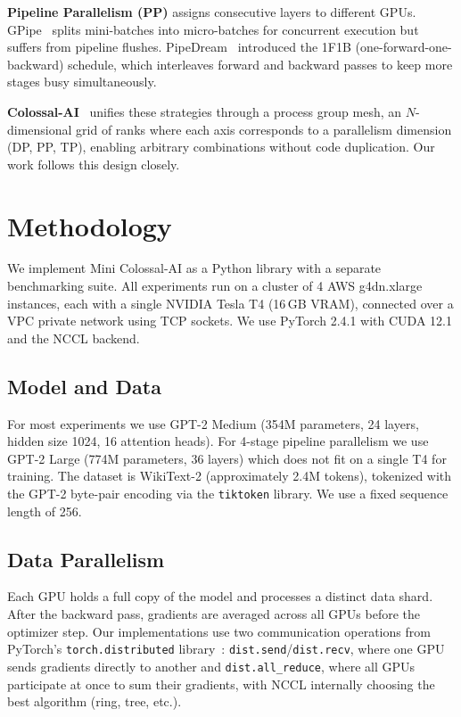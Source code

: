 \documentclass[conference]{IEEEtran}
\begin{document}
\textbf{Pipeline Parallelism (PP)} assigns consecutive layers to different GPUs. GPipe~\cite{DBLP:journals/corr/abs-1811-06965} splits mini-batches into micro-batches for concurrent execution but suffers from pipeline flushes. PipeDream~\cite{10.1145/3341301.3359646} introduced the 1F1B (one-forward-one-backward) schedule, which interleaves forward and backward passes to keep more stages busy simultaneously.

\textbf{Colossal-AI}~\cite{10.1145/3605573.3605613} unifies these strategies through a process group mesh, an $N$-dimensional grid of ranks where each axis corresponds to a parallelism dimension (DP, PP, TP), enabling arbitrary combinations without code duplication. Our work follows this design closely.


\section{Methodology}

We implement Mini Colossal-AI as a Python library with a separate benchmarking suite. All experiments run on a cluster of 4 AWS g4dn.xlarge instances, each with a single NVIDIA Tesla T4 (16\,GB VRAM), connected over a VPC private network using TCP sockets. We use PyTorch 2.4.1 with CUDA 12.1 and the NCCL backend.

\subsection{Model and Data}

For most experiments we use GPT-2 Medium (354M parameters, 24 layers, hidden size 1024, 16 attention heads). For 4-stage pipeline parallelism we use GPT-2 Large (774M parameters, 36 layers) which does not fit on a single T4 for training. The dataset is WikiText-2 (approximately 2.4M tokens), tokenized with the GPT-2 byte-pair encoding via the \texttt{tiktoken} library. We use a fixed sequence length of 256.

\subsection{Data Parallelism}

Each GPU holds a full copy of the model and processes a distinct data shard. After the backward pass, gradients are averaged across all GPUs before the optimizer step. Our implementations use two communication operations from PyTorch's \texttt{torch.distributed} library~\cite{li2020pytorch}: \texttt{dist.send}/\texttt{dist.recv}, where one GPU sends gradients directly to another and \texttt{dist.all\_reduce}, where all GPUs participate at once to sum their gradients, with NCCL internally choosing the best algorithm (ring, tree, etc.).
\end{document}
